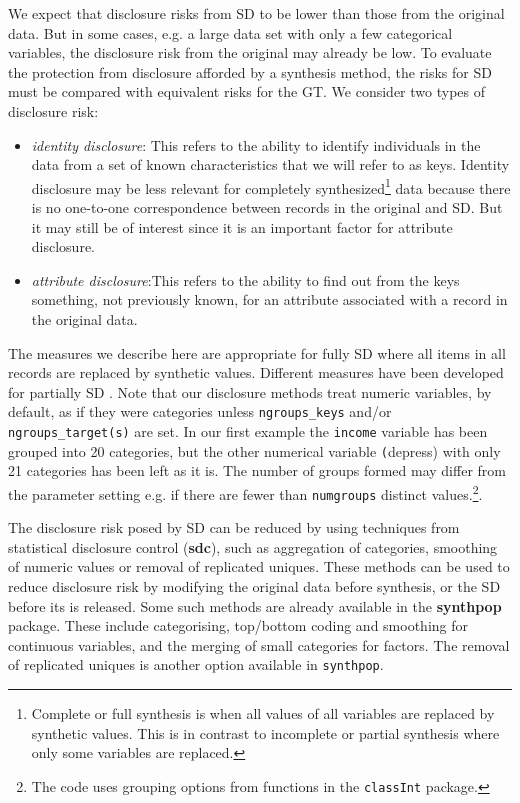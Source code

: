 \documentclass[12pt]{article}
\begin{document}
We expect that disclosure risks from SD to be lower than those from the original data. But in some cases, e.g. a large data set with only a few categorical variables, the disclosure risk from the original may already be low. To evaluate the protection from disclosure afforded by a synthesis method, the risks for SD must be compared with equivalent risks for the GT. We consider two types of disclosure risk:

\begin{itemize}
\item{\textit{identity disclosure}: This refers to the ability to identify individuals in the data from a set of known characteristics that we will refer to as keys. Identity disclosure may be less relevant for completely synthesized\footnote{Complete or full synthesis is when all values of all variables are replaced by synthetic values. This is in contrast to incomplete or partial synthesis where only some variables are replaced.} data because there is no one-to-one correspondence between records in the original and SD. But it may still be of interest since it is an important factor for attribute disclosure.}
\item{\textit{attribute disclosure}:This refers to the ability to find out from the keys something, not previously known, for an attribute associated with a record in the original data.}
\end{itemize}

The measures we describe here are appropriate for fully SD where all items in all records are replaced by synthetic values. Different measures have been developed for partially SD \cite{DrechslerReiter2009,ReiterMitra2009}. Note that our disclosure methods treat numeric variables, by default, as if they were categories unless \texttt{ngroups\_keys} and/or \texttt{ngroups\_target(s)} are set. In our first example the \texttt{income} variable has been grouped into 20 categories, but the other numerical variable \texttt(depress) with only 21 categories has been left as it is.  The number of groups formed may differ from the parameter setting e.g. if there are fewer than \texttt{numgroups} distinct values.\footnote{The code uses grouping options from functions in the \texttt{classInt} package.}. 

The disclosure risk posed by SD can be reduced by using techniques from statistical disclosure control (\textbf{sdc}), such as aggregation of categories, smoothing of numeric values or removal of replicated uniques. These methods can be used to reduce disclosure risk by modifying the original data before synthesis, or the SD before its is released. Some such methods are already available in the \textbf{synthpop} package. These include categorising, top/bottom coding and smoothing for continuous variables, and the merging of small categories for factors. The removal of replicated uniques is another option available in \texttt{synthpop}.
\end{document}
